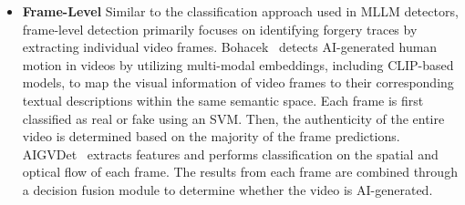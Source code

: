 \begin{itemize}
    \item \textbf{Frame-Level} 
    Similar to the classification approach used in MLLM detectors, frame-level detection primarily focuses on identifying forgery traces by extracting individual video frames. Bohacek~\cite{bohacek2024human} detects AI-generated human motion in videos by utilizing multi-modal embeddings, including CLIP-based models, to map the visual information of video frames to their corresponding textual descriptions within the same semantic space. Each frame is first classified as real or fake using an SVM. Then, the authenticity of the entire video is determined based on the majority of the frame predictions. AIGVDet~\cite{bai2024ai} extracts features and performs classification on the spatial and optical flow of each frame. The results from each frame are combined through a decision fusion module to determine whether the video is AI-generated.


\end{itemize}
